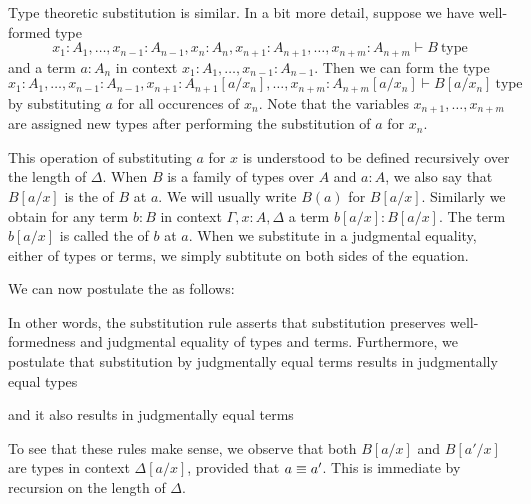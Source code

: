 Type theoretic substitution is similar. In a bit more detail, suppose we have well-formed type
\begin{equation*}
  x_1:A_1,\ldots,x_{n-1}:A_{n-1},x_n:A_n,x_{n+1}:A_{n+1},\ldots,x_{n+m}:A_{n+m}\vdash B~\textrm{type}
\end{equation*}
and a term $a:A_n$ in context $x_1:A_1,\ldots,x_{n-1}:A_{n-1}$. Then we can form the type
\begin{equation*}
  x_1:A_1,\ldots,x_{n-1}:A_{n-1},x_{n+1}:A_{n+1}[a/x_n],\ldots,x_{n+m}:A_{n+m}[a/x_n]\vdash B[a/x_n]~\textrm{type}
\end{equation*}
by substituting $a$ for all occurences of $x_n$. Note that the variables $x_{n+1},\ldots,x_{n+m}$ are assigned new types after performing the substitution of $a$ for $x_n$.

This operation of substituting $a$ for $x$ is understood to be defined recursively over the length of $\Delta$. When $B$ is a family of types over $A$ and $a:A$, we also say that $B[a/x]$ is the  of $B$ at $a$. We will usually write $B(a)$ for $B[a/x]$. Similarly we obtain for any term $b:B$ in context $\Gamma,x:A,\Delta$ a term $b[a/x]:B[a/x]$. The term $b[a/x]$ is called the  of $b$ at $a$. When we substitute in a judgmental equality, either of types or terms, we simply subtitute on both sides of the equation.

We can now postulate the  as follows:
\begin{prooftree}
\end{prooftree}
In other words, the substitution rule asserts that substitution preserves well-formedness and judgmental equality of types and terms. Furthermore, we postulate that substitution by judgmentally equal terms results in judgmentally equal types
\begin{prooftree}
\end{prooftree}
and it also results in judgmentally equal terms
\begin{prooftree}
\end{prooftree}
To see that these rules make sense, we observe that both $B[a/x]$ and $B[a'/x]$ are types in context $\Delta[a/x]$, provided that $a\jdeq a'$. This is immediate by recursion on the length of $\Delta$.

